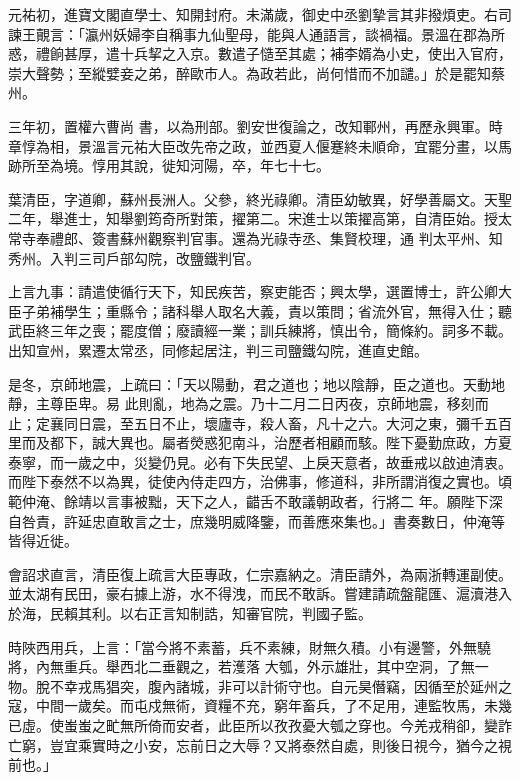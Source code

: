 \begin{pinyinscope}
 元祐初，進寶文閣直學士、知開封府。未滿歲，御史中丞劉摯言其非撥煩吏。右司諫王覿言：「瀛州妖婦李自稱事九仙聖母，能與人通語言，談禍福。景溫在郡為所惑，禮餉甚厚，遣十兵挈之入京。數遣子慥至其處；補李婿為小史，使出入官府，崇大聲勢；至縱嬖妾之弟，醉歐市人。為政若此，尚何惜而不加譴。」於是罷知蔡州。



 三年初，置權六曹尚
 書，以為刑部。劉安世復論之，改知鄆州，再歷永興軍。時章惇為相，景溫言元祐大臣改先帝之政，並西夏人偃蹇終未順命，宜罷分畫，以馬跡所至為境。惇用其說，徙知河陽，卒，年七十七。



 葉清臣，字道卿，蘇州長洲人。父參，終光祿卿。清臣幼敏異，好學善屬文。天聖二年，舉進士，知舉劉筠奇所對策，擢第二。宋進士以策擢高第，自清臣始。授太常寺奉禮郎、簽書蘇州觀察判官事。還為光祿寺丞、集賢校理，通
 判太平州、知秀州。入判三司戶部勾院，改鹽鐵判官。



 上言九事：請遣使循行天下，知民疾苦，察吏能否；興太學，選置博士，許公卿大臣子弟補學生；重縣令；諸科舉人取名大義，責以策問；省流外官，無得入仕；聽武臣終三年之喪；罷度僧；廢讀經一業；訓兵練將，慎出令，簡條約。詞多不載。出知宣州，累遷太常丞，同修起居注，判三司鹽鐵勾院，進直史館。



 是冬，京師地震，上疏曰：「天以陽動，君之道也；地以陰靜，臣之道也。天動地靜，主尊臣卑。易
 此則亂，地為之震。乃十二月二日丙夜，京師地震，移刻而止；定襄同日震，至五日不止，壞廬寺，殺人畜，凡十之六。大河之東，彌千五百里而及都下，誠大異也。屬者熒惑犯南斗，治歷者相顧而駭。陛下憂勤庶政，方夏泰寧，而一歲之中，災變仍見。必有下失民望、上戾天意者，故垂戒以啟迪清衷。而陛下泰然不以為異，徒使內侍走四方，治佛事，修道科，非所謂消復之實也。頃範仲淹、餘靖以言事被黜，天下之人，齰舌不敢議朝政者，行將二
 年。願陛下深自咎責，許延忠直敢言之士，庶幾明威降鑒，而善應來集也。」書奏數日，仲淹等皆得近徙。



 會詔求直言，清臣復上疏言大臣專政，仁宗嘉納之。清臣請外，為兩浙轉運副使。並太湖有民田，豪右據上游，水不得洩，而民不敢訴。嘗建請疏盤龍匯、滬瀆港入於海，民賴其利。以右正言知制誥，知審官院，判國子監。



 時陜西用兵，上言：「當今將不素蓄，兵不素練，財無久積。小有邊警，外無驍將，內無重兵。舉西北二垂觀之，若濩落
 大瓠，外示雄壯，其中空洞，了無一物。脫不幸戎馬猖突，腹內諸城，非可以計術守也。自元昊僭竊，因循至於延州之寇，中間一歲矣。而屯戍無術，資糧不充，窮年畜兵，了不足用，連監牧馬，未幾已虛。使蚩蚩之甿無所倚而安者，此臣所以孜孜憂大瓠之穿也。今羌戎稍卻，變詐亡窮，豈宜乘實時之小安，忘前日之大辱？又將泰然自處，則後日視今，猶今之視前也。」




\end{pinyinscope}
